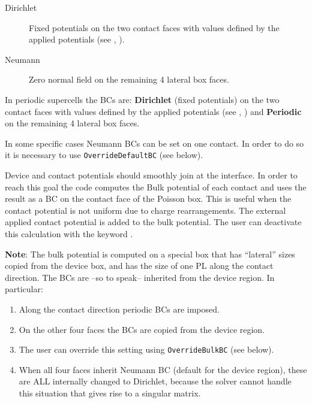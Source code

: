 \begin{description}
\item[Dirichlet] Fixed potentials on the two contact faces with values defined
  by the applied potentials (see , ).
\item[Neumann] Zero normal field on the remaining 4 lateral box faces.
\end{description}
In periodic supercells the BCs are: {\bf Dirichlet} (fixed potentials) on the
two contact faces with values defined by the applied potentials (see
, ) and {\bf Periodic} on the remaining
4 lateral box faces.

In some specific cases Neumann BCs can be set on one contact. In order to do so
it is necessary to use \verb|OverrideDefaultBC| (see below).

Device and contact potentials should smoothly join at the interface. In order to
reach this goal the code computes the Bulk potential of each contact and uses
the result as a BC on the contact face of the Poisson box. This is useful when
the contact potential is not uniform due to charge rearrangements. The external
applied contact potential is added to the bulk potential.  The user can
deactivate this calculation with the keyword .

{\bf Note}: The bulk potential is computed on a special box that has ``lateral''
sizes copied from the device box, and has the size of one PL along the contact
direction. The BCs are --so to speak-- inherited from the device region. In
particular:
\begin{enumerate}
\item Along the contact direction periodic BCs are imposed.
\item On the other four faces the BCs are copied from the device region.
\item The user can override this setting using \verb|OverrideBulkBC| (see
  below).
\item When all four faces inherit Neumann BC (default for the device region),
  these are ALL internally changed to Dirichlet, because the solver cannot
  handle this situation that gives rise to a singular matrix.
\end{enumerate}

